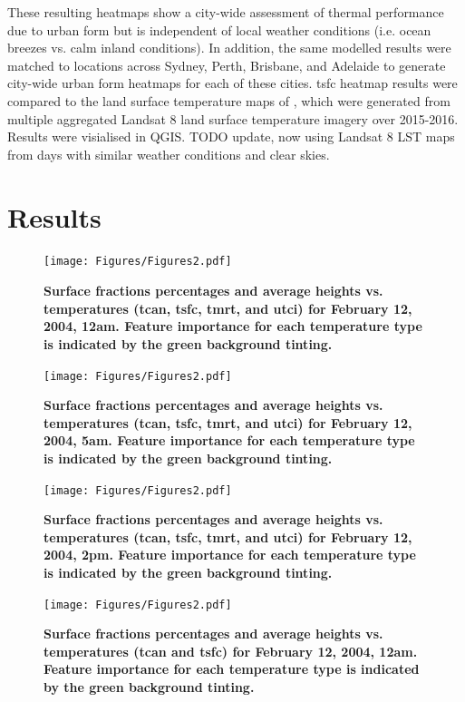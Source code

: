 \documentclass[final,3p,times,authoryear]{elsarticle}
\begin{document}
These resulting heatmaps show a city-wide assessment of thermal performance due to urban form but is independent of local weather conditions (i.e. ocean breezes vs. calm inland conditions). In addition, the same modelled results were matched to locations across Sydney, Perth, Brisbane, and Adelaide to generate city-wide urban form heatmaps for each of these cities.  \gls{tsfc} heatmap results were compared to the land surface temperature maps of \cite{Devereux2017}, which were generated from multiple aggregated Landsat 8 land surface temperature imagery over 2015-2016. Results were visialised in QGIS. TODO update, now using Landsat 8 LST maps from days with similar weather conditions and clear skies.

\section{Results}\label{sec:results}




\begin{figure}
\centering
\texttt{[image: Figures/Figures2.pdf]}
\caption{\bf Surface fractions percentages and average heights vs. temperatures (\gls{tcan}, \gls{tsfc}, \gls{tmrt}, and \gls{utci}) for February 12, 2004, 12am. Feature importance for each temperature type is indicated by the green background tinting.}
 \label{fig:box0}
\end{figure} 

\begin{figure}
\centering
\texttt{[image: Figures/Figures2.pdf]}
\caption{\bf Surface fractions percentages and average heights vs. temperatures (\gls{tcan}, \gls{tsfc}, \gls{tmrt}, and \gls{utci}) for February 12, 2004, 5am. Feature importance for each temperature type is indicated by the green background tinting.}
 \label{fig:box5}
\end{figure} 

\begin{figure}
\centering
\texttt{[image: Figures/Figures2.pdf]}
\caption{\bf Surface fractions percentages and average heights vs. temperatures (\gls{tcan}, \gls{tsfc}, \gls{tmrt}, and \gls{utci}) for February 12, 2004, 2pm. Feature importance for each temperature type is indicated by the green background tinting.}
 \label{fig:box14}
\end{figure} 


\begin{figure}
\centering
\texttt{[image: Figures/Figures2.pdf]}
\caption{\bf Surface fractions percentages and average heights vs. temperatures (\gls{tcan} and \gls{tsfc}) for February 12, 2004, 12am. Feature importance for each temperature type is indicated by the green background tinting.}
 \label{fig:box0a}
\end{figure} 
\end{document}
